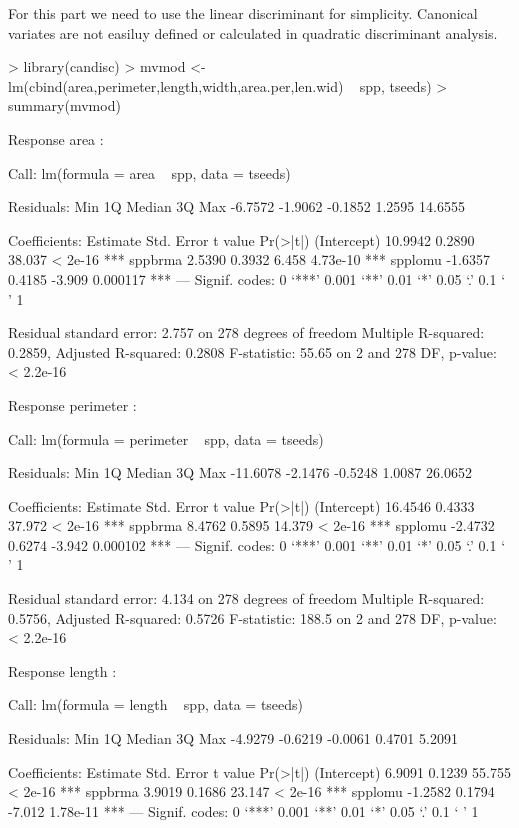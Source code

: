 \documentclass{article}
\begin{document}
For this part we need to use the linear discriminant for simplicity. Canonical variates are not easiluy defined or calculated in quadratic discriminant analysis.

\begin{Schunk}
\begin{Sinput}
> library(candisc)
> mvmod <- lm(cbind(area,perimeter,length,width,area.per,len.wid) ~ spp, tseeds)
> summary(mvmod)
\end{Sinput}
\begin{Soutput}
Response area :

Call:
lm(formula = area ~ spp, data = tseeds)

Residuals:
    Min      1Q  Median      3Q     Max 
-6.7572 -1.9062 -0.1852  1.2595 14.6555 

Coefficients:
            Estimate Std. Error t value Pr(>|t|)    
(Intercept)  10.9942     0.2890  38.037  < 2e-16 ***
sppbrma       2.5390     0.3932   6.458 4.73e-10 ***
spplomu      -1.6357     0.4185  -3.909 0.000117 ***
---
Signif. codes:  0 ‘***’ 0.001 ‘**’ 0.01 ‘*’ 0.05 ‘.’ 0.1 ‘ ’ 1

Residual standard error: 2.757 on 278 degrees of freedom
Multiple R-squared:  0.2859,	Adjusted R-squared:  0.2808 
F-statistic: 55.65 on 2 and 278 DF,  p-value: < 2.2e-16


Response perimeter :

Call:
lm(formula = perimeter ~ spp, data = tseeds)

Residuals:
     Min       1Q   Median       3Q      Max 
-11.6078  -2.1476  -0.5248   1.0087  26.0652 

Coefficients:
            Estimate Std. Error t value Pr(>|t|)    
(Intercept)  16.4546     0.4333  37.972  < 2e-16 ***
sppbrma       8.4762     0.5895  14.379  < 2e-16 ***
spplomu      -2.4732     0.6274  -3.942 0.000102 ***
---
Signif. codes:  0 ‘***’ 0.001 ‘**’ 0.01 ‘*’ 0.05 ‘.’ 0.1 ‘ ’ 1

Residual standard error: 4.134 on 278 degrees of freedom
Multiple R-squared:  0.5756,	Adjusted R-squared:  0.5726 
F-statistic: 188.5 on 2 and 278 DF,  p-value: < 2.2e-16


Response length :

Call:
lm(formula = length ~ spp, data = tseeds)

Residuals:
    Min      1Q  Median      3Q     Max 
-4.9279 -0.6219 -0.0061  0.4701  5.2091 

Coefficients:
            Estimate Std. Error t value Pr(>|t|)    
(Intercept)   6.9091     0.1239  55.755  < 2e-16 ***
sppbrma       3.9019     0.1686  23.147  < 2e-16 ***
spplomu      -1.2582     0.1794  -7.012 1.78e-11 ***
---
Signif. codes:  0 ‘***’ 0.001 ‘**’ 0.01 ‘*’ 0.05 ‘.’ 0.1 ‘ ’ 1


\end{Soutput}
\end{Schunk}
\end{document}
